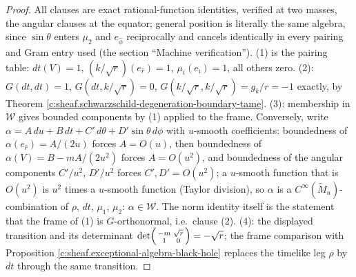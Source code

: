 \documentclass[11pt]{article}
\theoremstyle{definition}
\theoremstyle{plain}
\providecommand{\Mt}{}\renewcommand{\Mt}{\widetilde{M}}
\providecommand{\dtPG}{}\renewcommand{\dtPG}{dt}
\providecommand{\shW}{}\renewcommand{\shW}{\mathcal{W}}
\begin{document}
\begin{proof}
All clauses are exact rational-function identities, verified at two masses, the angular clauses at the equator; general position is literally the same algebra, since $\sin\theta$ enters $\mu_2$ and $e_{\hat\phi}$ reciprocally and cancels identically in every pairing and Gram entry used (the section ``Machine verification''). (1) is the pairing table: $\dtPG(V) = 1$, $(k/\sqrt r)(e_{\hat r}) = 1$, $\mu_i(e_{\hat\imath}) = 1$, all others zero. (2): $G(\dtPG,\dtPG) = 1$, $G(\dtPG, k/\sqrt r) = 0$, $G(k/\sqrt r, k/\sqrt r) = g_k/r = -1$ exactly, by Theorem \ref{c:sheaf.schwarzschild-degeneration-boundary-tame}. (3): membership in $\shW$ gives bounded components by (1) applied to the frame. Conversely, write $\alpha = A\,du + B\,dt + C'\,d\theta + D'\sin\theta\,d\phi$ with $u$-smooth coefficients: boundedness of $\alpha(e_{\hat r}) = A/(2u)$ forces $A = O(u)$, then boundedness of $\alpha(V) = B - mA/(2u^2)$ forces $A = O(u^2)$, and boundedness of the angular components $C'/u^2$, $D'/u^2$ forces $C', D' = O(u^2)$; a $u$-smooth function that is $O(u^2)$ is $u^2$ times a $u$-smooth function (Taylor division), so $\alpha$ is a $C^\infty(\Mt_u)$-combination of $\rho$, $dt$, $\mu_1$, $\mu_2$: $\alpha \in \shW$. The norm identity itself is the statement that the frame of (1) is $G$-orthonormal, i.e.\ clause (2). (4): the displayed transition and its determinant $\det\begin{psmallmatrix} -m & \sqrt r\\ 1 & 0\end{psmallmatrix} = -\sqrt r$; the frame comparison with Proposition \ref{c:sheaf.exceptional-algebra-black-hole} replaces the timelike leg $\rho$ by $\dtPG$ through the same transition.

\end{proof}
\end{document}
